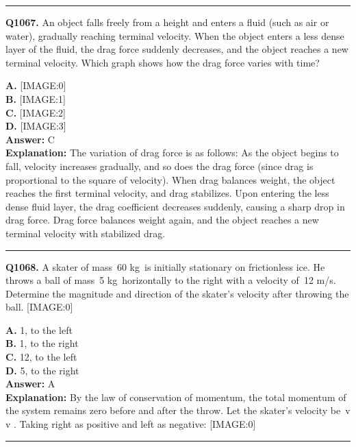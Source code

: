 \documentclass[12pt]{article}
\begin{document}
\hrule
\vspace{1em}


\noindent
\textbf{Q1067.} An object falls freely from a height and enters a fluid (such as air or water), gradually reaching terminal velocity. When the object enters a less dense layer of the fluid, the drag force suddenly decreases, and the object reaches a new terminal velocity. Which graph shows how the drag force varies with time?



\textbf{A.} [IMAGE:0] \\
\textbf{B.} [IMAGE:1] \\
\textbf{C.} [IMAGE:2] \\
\textbf{D.} [IMAGE:3] \\

\textbf{Answer:} C \\
\textbf{Explanation:} The variation of drag force is as follows:
As the object begins to fall, velocity increases gradually, and so does the drag force (since drag is proportional to the square of velocity).
When drag balances weight, the object reaches the first terminal velocity, and drag stabilizes.
Upon entering the less dense fluid layer, the drag coefficient decreases suddenly, causing a sharp drop in drag force.
Drag force balances weight again, and the object reaches a new terminal velocity with stabilized drag.

\hrule
\vspace{1em}


\noindent
\textbf{Q1068.} A skater of mass 60
kg is initially stationary on frictionless ice. He throws a ball of mass 5
kg horizontally to the right with a velocity of 12
m/s. Determine the magnitude and direction of the skater’s velocity after throwing the ball.
[IMAGE:0]



\textbf{A.} 1, to the left \\
\textbf{B.} 1, to the right \\
\textbf{C.} 12, to the left \\
\textbf{D.} 5, to the right \\

\textbf{Answer:} A \\
\textbf{Explanation:} By the law of conservation of momentum, the total momentum of the system remains zero before and after the throw. Let the skater’s velocity be v
v
. Taking right as positive and left as negative:
[IMAGE:0]

\hrule
\vspace{1em}
\end{document}
